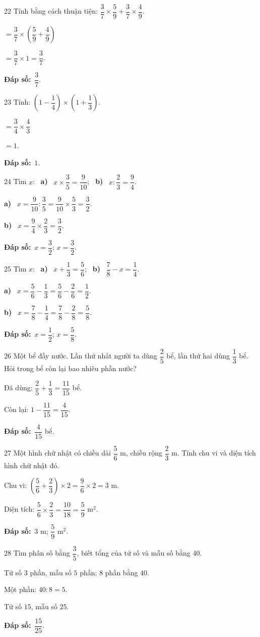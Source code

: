 \documentclass[11pt]{article}
\newif\ifsol \solfalse
\providecommand{\AnsWord}{Đáp số}
\newcommand{\dapso}[1]{\par\textbf{\AnsWord:}\ #1}
\newcommand{\probsol}[1]{%
  \begin{lrbox}{\solmeasure}\begin{minipage}{\dimexpr\linewidth-24pt\relax}#1\end{minipage}\end{lrbox}%
  \ifsol
    \begin{solbox}#1\end{solbox}%
  \else
    \setlength{\solht}{\dimexpr\ht\solmeasure+\dp\solmeasure+0.85cm\relax}%
    \ifdim\solht<1.35cm\setlength{\solht}{1.35cm}\fi
    \begin{tcolorbox}[colback=white,colframe=Line,boxrule=0.8pt,arc=5pt,
      left=8pt,right=8pt,top=4pt,bottom=4pt,height=\solht]{\footnotesize\color{Slate}\itshape\WorkWord}\end{tcolorbox}%
  \fi}
\newcommand{\pa}[1]{\textbf{#1)}\ }
\newcommand{\gap}{\vspace{0.3cm}}
\def\WorkWord{Bài làm:}
\def\AnsWord{Đáp số}
\begin{document}
\gap
\begin{probbox}{22}{\relax}
Tính bằng cách thuận tiện: $\dfrac37\times\dfrac59+\dfrac37\times\dfrac49$.
\end{probbox}
\probsol{
$=\dfrac37\times\left(\dfrac59+\dfrac49\right)$\par $=\dfrac37\times1=\dfrac37$.
\dapso{$\dfrac37$.}}
\gap
\begin{probbox}{23}{\relax}
Tính: $\left(1-\dfrac14\right)\times\left(1+\dfrac13\right)$.
\end{probbox}
\probsol{
$=\dfrac34\times\dfrac43$\par $=1$.
\dapso{$1$.}}
\gap
\begin{probbox}{24}{\relax}
Tìm $x$: \ \pa{a} $x\times\dfrac35=\dfrac9{10}$; \ \pa{b} $x:\dfrac23=\dfrac94$.
\end{probbox}
\probsol{
\pa{a} $x=\dfrac9{10}:\dfrac35=\dfrac9{10}\times\dfrac53=\dfrac32$.\par \pa{b} $x=\dfrac94\times\dfrac23=\dfrac32$.
\dapso{$x=\dfrac32$; $x=\dfrac32$.}}
\gap
\begin{probbox}{25}{\relax}
Tìm $x$: \ \pa{a} $x+\dfrac13=\dfrac56$; \ \pa{b} $\dfrac78-x=\dfrac14$.
\end{probbox}
\probsol{
\pa{a} $x=\dfrac56-\dfrac13=\dfrac56-\dfrac26=\dfrac12$.\par \pa{b} $x=\dfrac78-\dfrac14=\dfrac78-\dfrac28=\dfrac58$.
\dapso{$x=\dfrac12$; $x=\dfrac58$.}}
\gap
\begin{probbox}{26}{\relax}
Một bể đầy nước. Lần thứ nhất người ta dùng $\dfrac25$ bể, lần thứ hai dùng $\dfrac13$ bể. Hỏi trong bể còn lại bao nhiêu phần nước?
\end{probbox}
\probsol{
Đã dùng: $\dfrac25+\dfrac13=\dfrac{11}{15}$ bể.\par Còn lại: $1-\dfrac{11}{15}=\dfrac4{15}$.
\dapso{$\dfrac4{15}$ bể.}}
\gap
\begin{probbox}{27}{\relax}
Một hình chữ nhật có chiều dài $\dfrac56$ m, chiều rộng $\dfrac23$ m. Tính chu vi và diện tích hình chữ nhật đó.
\end{probbox}
\probsol{
Chu vi: $\left(\dfrac56+\dfrac23\right)\times2=\dfrac96\times2=3$ m.\par Diện tích: $\dfrac56\times\dfrac23=\dfrac{10}{18}=\dfrac59$ m$^2$.
\dapso{$3$ m; $\dfrac59$ m$^2$.}}
\gap
\begin{probbox}{28}{\relax}
Tìm phân số bằng $\dfrac35$, biết tổng của tử số và mẫu số bằng $40$.
\end{probbox}
\probsol{
Tử số $3$ phần, mẫu số $5$ phần; $8$ phần bằng $40$.\par Một phần: $40:8=5$.\par Tử số $15$, mẫu số $25$.
\dapso{$\dfrac{15}{25}$.}}
\end{document}
